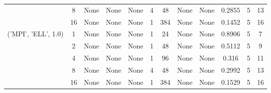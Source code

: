 \begin{tabular}{cccccccccccc}
& 8& None& None& None& 4& 48& None& None& 0.2855& 5& 13\\
& 16& None& None& None& 1& 384& None& None& 0.1452& 5& 16\\
\hline
\multirow{5}{*}{('MPI', 'ELL', 1.0)}& 1& None& None& None& 1& 24& None& None& 0.8906& 5& 7\\
& 2& None& None& None& 1& 48& None& None& 0.5112& 5& 9\\
& 4& None& None& None& 1& 96& None& None& 0.316& 5& 11\\
& 8& None& None& None& 4& 48& None& None& 0.2992& 5& 13\\
& 16& None& None& None& 1& 384& None& None& 0.1529& 5& 16\\
\hline
\end{tabular}
